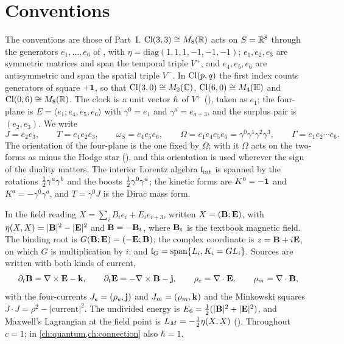 \section{Conventions}
\label{sec:conv}

The conventions are those of Part~I. $\mathrm{Cl}(3,3)\cong M_8(\mathbb{R})$ acts on $S=\mathbb{R}^8$ through the generators $e_1,\dots,e_6$ of ,
with $\eta=\mathrm{diag}(1,1,1,-1,-1,-1)$; $e_1,e_2,e_3$ are symmetric matrices and span the temporal triple $V^+$, and $e_4,e_5,e_6$ are
antisymmetric and span the spatial triple $V^-$. In $\mathrm{Cl}(p,q)$ the first index counts generators of square $+\mathbf 1$, so that
$\mathrm{Cl}(3,0)\cong M_2(\mathbb{C})$, $\mathrm{Cl}(6,0)\cong M_4(\mathbb H)$ and $\mathrm{Cl}(0,6)\cong M_8(\mathbb{R})$. The clock is a unit vector $\hat n$ of $V^+$
(), taken as $e_1$; the four-plane is $E=\langle e_1;e_4,e_5,e_6\rangle$ with $\gamma^0=e_1$ and $\gamma^a=e_{a+3}$, and
the surplus pair is $(e_2,e_3)$. We write
\[
J=e_2e_3,\qquad T=e_1e_2e_3,\qquad \omega_S=e_4e_5e_6,\qquad \Omega=e_1e_4e_5e_6=\gamma^0\gamma^1\gamma^2\gamma^3,\qquad \Gamma=e_1e_2\cdots e_6 .
\]
The orientation of the four-plane is the one fixed by $\Omega$; with it $\Omega$ acts on the two-forms as minus the Hodge star
(), and this orientation is used wherever the sign of the duality matters. The interior Lorentz algebra $\mathfrak l_{\rm int}$ is spanned by
the rotations $\tfrac12\gamma^a\gamma^b$ and the boosts $\tfrac12\gamma^0\gamma^a$; the kinetic forms are $K^0=-\mathbf 1$ and $K^a=-\gamma^0\gamma^a$, and
$T=\gamma^0J$ is the Dirac mass form.

In the field reading $X=\sum_iB_ie_i+E_ie_{i+3}$, written $X=(\mathbf B;\mathbf E)$, with $\eta(X,X)=|\mathbf B|^2-|\mathbf E|^2$ and $\mathbf B=-\mathbf B_{\rm t}$, where $\mathbf B_{\rm t}$
is the textbook magnetic field. The binding root is $G(\mathbf B;\mathbf E)=(-\mathbf E;\mathbf B)$; the complex coordinate is $z=\mathbf B+i\mathbf E$, on which $G$ is
multiplication by $i$; and $\mathfrak l_G=\mathrm{span}\{L_i,K_i=GL_i\}$. Sources are written with both kinds of current,
\begin{equation}
\label{eq:sources}
\partial_t\mathbf B=\nabla\times\mathbf E-\mathbf k,\qquad \partial_t\mathbf E=-\nabla\times\mathbf B-\mathbf j,\qquad \rho_e=\nabla\cdot\mathbf E,\qquad \rho_m=\nabla\cdot\mathbf B ,
\end{equation}
with the four-currents $J_e=(\rho_e,\mathbf j)$ and $J_m=(\rho_m,\mathbf k)$ and the Minkowski squares $J\cdot J=\rho^2-|\text{current}|^2$. The
undivided energy is $E_6=\tfrac12(|\mathbf B|^2+|\mathbf E|^2)$, and Maxwell's Lagrangian at the field point is $L_M=-\tfrac12\eta(X,X)$ ().
Throughout $c=1$; in \cref{ch:quantum,ch:connection} also $\hbar=1$.

